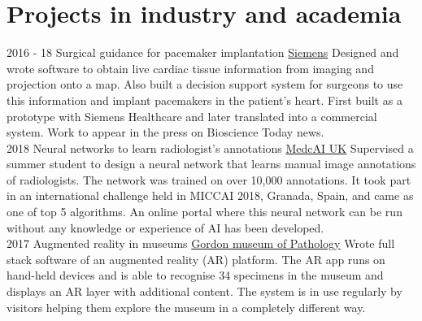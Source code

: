 \documentclass[letterpaper]{twentysecondcv} %
\begin{document}
\section{Projects in industry and academia}
\begin{twenty}
	\twentyitem
    	{2016 - 18}
		{}
        {Surgical guidance for pacemaker implantation}
        {\href{https://www.healthcare.siemens.co.uk/about}{Siemens}}
        {}
        {
		Designed and wrote software to obtain live cardiac tissue information from imaging and projection onto a map. Also built a decision support system for surgeons to use this information and implant pacemakers in the patient's heart. First built as a prototype with Siemens Healthcare and later translated into a commercial system. Work to appear in the press on Bioscience Today news.}
		\\
	\twentyitem
    	{2018}
		{}
        {Neural networks to learn radiologist's annotations}
        {\href{http://www.medcai.co.uk}{MedcAI UK}}
        {
		Supervised a summer student to design a neural network that learns manual image annotations of radiologists. The network was trained on over 10,000 annotations. It took part in an international challenge held in MICCAI 2018, Granada, Spain, and came as one of top 5 algorithms. An online portal where this neural network can be run without any knowledge or experience of AI has been developed.}
		\\
	\twentyitem
    	{2017}
		{}
        {Augmented reality in museums}
        {\href{https://www.kcl.ac.uk/gordon/index.aspx}{Gordon museum of Pathology}}
        {
		Wrote full stack software of an augmented reality (AR) platform. The AR app runs on hand-held devices and is able to recognise 34 specimens in the museum and displays an AR layer with additional content. The system is in use regularly by visitors helping them explore the museum in a completely different way. }
		\\ 


\end{twenty}
\end{document}
